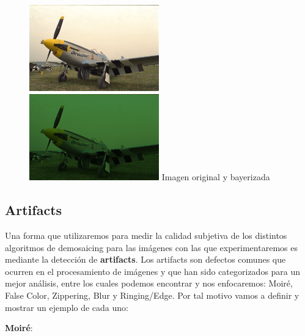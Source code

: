 \begin{figure}[h]
       \includegraphics[width=0.5\textwidth]{imagenes/img9.png}
           \hfill
        \includegraphics[width=0.5\textwidth]{imagenes/img9_bayer.png}   
        Imagen original y bayerizada
\end{figure}
\newpage
\subsection{Artifacts}

Una forma que utilizaremos para medir la calidad subjetiva de los distintos algoritmos de demosaicing para las imágenes con las que experimentaremos es mediante la detección de \textbf{artifacts}. Los artifacts son defectos comunes que ocurren en el procesamiento de imágenes y que han sido categorizados para un mejor análisis, entre los cuales podemos encontrar y nos enfocaremos: Moiré, False Color, Zippering, Blur y Ringing/Edge. Por tal motivo vamos a definir y mostrar un ejemplo de cada uno:

\textbf{Moiré}:\\
\\


